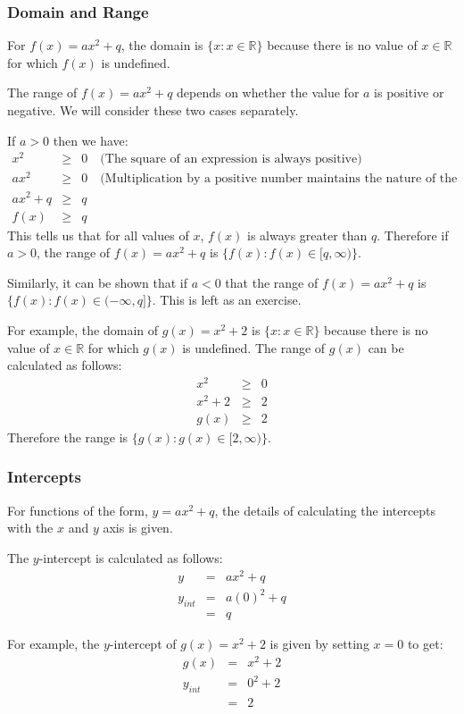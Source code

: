 \documentclass[10pt,a4paper,titlepage,twoside,openright]{report}
\begin{document}
\subsubsection{Domain and Range}
For $f(x)=ax^2+q$, the domain is $\{x:x\in\mathbb{R}\}$ because there is no value of $x \in \mathbb{R}$ for which $f(x)$ is undefined.

The range of $f(x)=ax^2+q$ depends on whether the value for $a$ is positive or negative. We will consider these two cases separately.

If $a>0$ then we have:
\begin{eqnarray*}
x^2&\ge& 0 \quad \mbox{(The square of an expression is always positive)} \\
ax^2&\ge& 0 \quad \mbox{(Multiplication by a positive number maintains the nature of the inequality)} \\
ax^2 + q &\ge& q\\
f(x) &\ge& q
\end{eqnarray*}
This tells us that for all values of $x$, $f(x)$ is always greater than $q$. Therefore if $a>0$, the range of $f(x)=ax^2+q$ is $\{f(x):f(x)\in[q,\infty)\}$.

Similarly, it can be shown that if $a<0$ that the range of $f(x)=ax^2+q$ is $\{f(x):f(x)\in(-\infty,q]\}$. This is left as an exercise.

For example, the domain of $g(x)=x^2 + 2$ is $\{x:x\in\mathbb{R}\}$ because there is no value of $x \in \mathbb{R}$ for which $g(x)$ is undefined. The range of $g(x)$ can be calculated as follows:
\begin{eqnarray*}
x^2&\ge& 0\\
x^2+2&\ge& 2\\
g(x) &\ge& 2
\end{eqnarray*}
Therefore the range is $\{g(x):g(x)\in[2,\infty)\}$.

\subsubsection{Intercepts}
For functions of the form, $y=ax^2+q$, the details of calculating the intercepts with the $x$ and $y$ axis is given.

The $y$-intercept is calculated as follows:
\begin{eqnarray}
y&=&ax^2+q\\
y_{int}&=&a(0)^2+q\\
&=&q
\end{eqnarray}

For example, the $y$-intercept of $g(x)=x^2 + 2$ is given by setting $x=0$ to get:
\begin{eqnarray*}
g(x)&=&x^2 + 2\\
y_{int}&=&0^2 + 2\\
&=&2
\end{eqnarray*}
\end{document}
